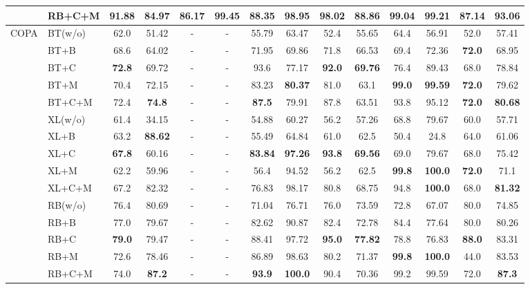 \documentclass[11pt,a4paper]{article}
\begin{document}
\begin{table*}[th]
\begin{tabular}{ll|c|ccccccccccc}
 						       \\ 
		   & RB+C+M& 91.88&84.97&\bf{86.17}&\bf{99.45}&88.35&\bf{98.95}&98.02&88.86&99.04&99.21&87.14&\bf{93.06}
 					     	       \\ 

	\midrule
		\multirow{15}{*}{COPA} 

 		    
                &  BT(w/o) &62.0&51.42&-&-&55.79&63.47&52.4&55.65&64.4&56.91&52.0&57.41
                						\\ 
		&  BT+B & 68.6&64.02&-&-&71.95&69.86&71.8&66.53&69.4&72.36&\bf{72.0}&68.95
 						        \\ 
		&  BT+C & \bf{72.8}&69.72&-&-&93.6&77.17&\bf{92.0}&\bf{69.76}&76.4&89.43&68.0&78.84
 						        \\ 
		   & BT+M &70.4&72.15&-&-&83.23&\bf{80.37}&81.0&63.1&\bf{99.0}&\bf{99.59}&\bf{72.0}&79.62
 						       \\ 
		   & BT+C+M&72.4&\bf{74.8}&-&-&\bf{87.5}&79.91&87.8&63.51&93.8&95.12&\bf{72.0}&\bf{80.68}
		
 					     	       \\ \cmidrule{2-14}
						          
			&  XL(w/o) &61.4&34.15&-&-&54.88&60.27&56.2&57.26&68.8&79.67&60.0&57.71
                						\\ 
		&  XL+B & 63.2&\bf{88.62}&-&-&55.49&64.84&61.0&62.5&50.4&24.8&64.0&61.06
 						        \\ 
		&  XL+C & \bf{67.8}&60.16&-&-&\bf{83.84}&\bf{97.26}&\bf{93.8}&\bf{69.56}&69.0&79.67&68.0&75.42
 						        \\ 
		   & XL+M & 62.2&59.96&-&-&56.4&94.52&56.2&62.5&\bf{99.8}&\bf{100.0}&\bf{72.0}&71.1
 						       \\ 
		   & XL+C+M&67.2&82.32&-&-&76.83&98.17&80.8&68.75&94.8&\bf{100.0}&68.0&\bf{81.32}
 					     	       \\ \cmidrule{2-14}
	&  RB(w/o) & 76.4&80.69&-&-&71.04&76.71&76.0&73.59&72.8&67.07&80.0&74.85
                						\\ 
		&  RB+B & 77.0&79.67&-&-&82.62&90.87&82.4&72.78&84.4&77.64&80.0&80.26
 						        \\ 
		&  RB+C & \bf{79.0}&79.47&-&-&88.41&97.72&\bf{95.0}&\bf{77.82}&78.8&76.83&\bf{88.0}&83.31
 						        \\ 
		   & RB+M &72.6&78.46&-&-&86.89&98.63&80.2&71.37&\bf{99.8}&\bf{100.0}&44.0&83.53
 						       \\ 
		   & RB+C+M& 74.0&\bf{87.2}&-&-&\bf{93.9}&\bf{100.0}&90.4&70.36&99.2&99.59&72.0&\bf{87.3}
 					     	       \\ 



\end{tabular}
\end{table*}
\end{document}
